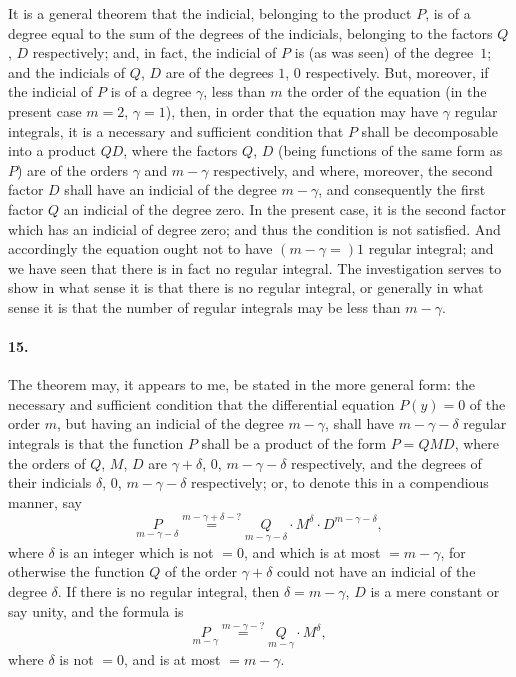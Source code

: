 \documentclass[11pt,a4paper]{article}
\theoremstyle{definition}
\begin{document}
It is a general theorem that the indicial, belonging to the product $P$, is of a degree equal to the sum of the degrees of the indicials, belonging to the factors $Q$, $D$ respectively; and, in fact, the indicial of $P$ is (as was seen) of the degree~$1$; and the indicials of $Q$, $D$ are of the degrees $1$, $0$ respectively. But, moreover, if the indicial of $P$ is of a degree $\gamma$, less than $m$ the order of the equation (in the present case $m=2$, $\gamma=1$), then, in order that the equation may have $\gamma$ regular integrals, it is a necessary and sufficient condition that $P$ shall be decomposable into a product $QD$, where the factors $Q$, $D$ (being functions of the same form as $P$) are of the orders $\gamma$ and $m-\gamma$ respectively, and where, moreover, the second factor $D$ shall have an indicial of the degree $m-\gamma$, and consequently the first factor $Q$ an indicial of the degree zero. In the present case, it is the second factor which has an indicial of degree zero; and thus the condition is not satisfied. And accordingly the equation ought not to have $(m-\gamma=)1$ regular integral; and we have seen that there is in fact no regular integral. The investigation serves to show in what sense it is that there is no regular integral, or generally in what sense it is that the number of regular integrals may be less than $m-\gamma$.

\paragraph{15.} The theorem may, it appears to me, be stated in the more general form: the necessary and sufficient condition that the differential equation $P(y) = 0$ of the order $m$, but having an indicial of the degree $m-\gamma$, shall have $m-\gamma-\delta$ regular integrals is that the function $P$ shall be a product of the form $P = QMD$, where the orders of $Q$, $M$, $D$ are $\gamma+\delta$, $0$, $m-\gamma-\delta$ respectively, and the degrees of their indicials $\delta$, $0$, $m-\gamma-\delta$ respectively; or, to denote this in a compendious manner, say
\[
\underset{m-\gamma-\delta}{P} \overset{m-\gamma+\delta-?}{=} \underset{m-\gamma-\delta}{Q} \cdot M^{\delta} \cdot D^{m-\gamma-\delta},
\]
where $\delta$ is an integer which is not $=0$, and which is at most $=m-\gamma$, for otherwise the function $Q$ of the order $\gamma+\delta$ could not have an indicial of the degree $\delta$. If there is no regular integral, then $\delta = m-\gamma$, $D$ is a mere constant or say unity, and the formula is
\[
\underset{m-\gamma}{P} \overset{m-\gamma-?}{=} \underset{m-\gamma}{Q} \cdot M^{\delta},
\]
where $\delta$ is not $=0$, and is at most $=m-\gamma$.
\end{document}

